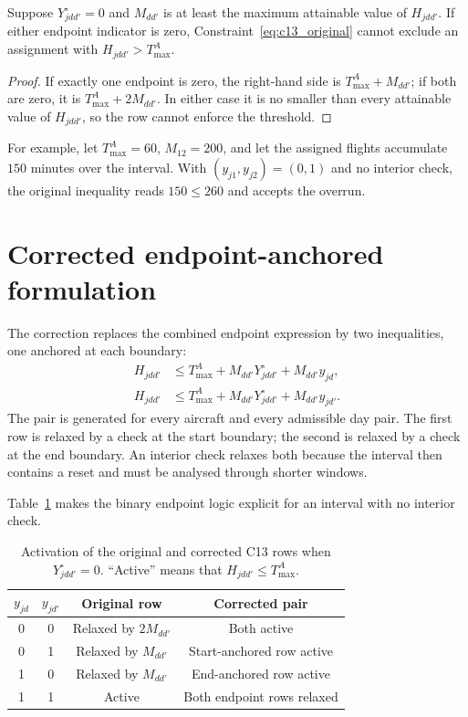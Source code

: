 \begin{lemma}
    \label{lem:c13_endpoint_defect}
    Suppose $Y_{jdd'}^{\circ}=0$ and $M_{dd'}$ is at least the maximum
    attainable value of $H_{jdd'}$. If either endpoint indicator is zero,
    Constraint~\eqref{eq:c13_original} cannot exclude an assignment with
    $H_{jdd'}>T_{\max}^{A}$.
\end{lemma}
\begin{proof}
    If exactly one endpoint is zero, the right-hand side is
    $T_{\max}^{A}+M_{dd'}$; if both are zero, it is
    $T_{\max}^{A}+2M_{dd'}$. In either case it is no smaller than every
    attainable value of $H_{jdd'}$, so the row cannot enforce the threshold.
\end{proof}

For example, let $T_{\max}^{A}=60$, $M_{12}=200$, and let the assigned flights
accumulate $150$ minutes over the interval. With
$(y_{j1},y_{j2})=(0,1)$ and no interior check, the original inequality reads
$150\leq260$ and accepts the overrun.

\section{Corrected endpoint-anchored formulation}
\label{sec:c13_correction}

The correction replaces the combined endpoint expression by two inequalities,
one anchored at each boundary:
\begin{align}
    H_{jdd'}
    &\leq T_{\max}^{A}
    +M_{dd'}Y_{jdd'}^{\circ}+M_{dd'}y_{jd},
    \label{eq:c13a}\\
    H_{jdd'}
    &\leq T_{\max}^{A}
    +M_{dd'}Y_{jdd'}^{\circ}+M_{dd'}y_{jd'}.
    \label{eq:c13b}
\end{align}
The pair is generated for every aircraft and every admissible day pair. The
first row is relaxed by a check at the start boundary; the second is relaxed
by a check at the end boundary. An interior check relaxes both because the
interval then contains a reset and must be analysed through shorter windows.

Table~\ref{tab:c13_activation} makes the binary endpoint logic explicit for an
interval with no interior check.
\begin{table}[htbp]
    \centering
    \small
    \caption{Activation of the original and corrected C13 rows when
    $Y_{jdd'}^{\circ}=0$. ``Active'' means that $H_{jdd'}\leq T_{\max}^{A}$.}
    \label{tab:c13_activation}
    \begin{tabular}{cccc}
        \toprule
        $y_{jd}$ & $y_{jd'}$ & Original row & Corrected pair \\
        \midrule
        0 & 0 & Relaxed by $2M_{dd'}$ & Both active \\
        0 & 1 & Relaxed by $M_{dd'}$ & Start-anchored row active \\
        1 & 0 & Relaxed by $M_{dd'}$ & End-anchored row active \\
        1 & 1 & Active & Both endpoint rows relaxed \\
        \bottomrule
    \end{tabular}
\end{table}

